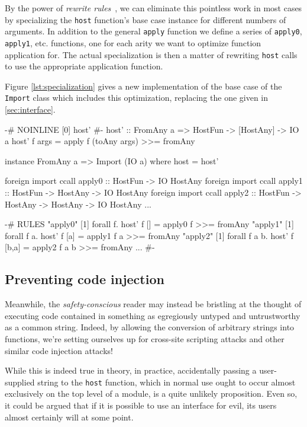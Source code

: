 \documentclass{sigplanconf}
\begin{document}
By the power of \emph{rewrite rules}\ \cite{rewriterules}, we can
eliminate this pointless work in most cases by specializing the
\lstinline!host! function's base case instance for different numbers of
arguments.
In addition to the general \lstinline!apply! function we define a series of
\lstinline!apply0!, \lstinline!apply1!, etc. functions, one for each arity
we want to optimize function application for.
The actual specialization is then a matter of
rewriting \lstinline!host! calls to use the appropriate application function.

Figure \ref{lst:specialization} gives a new implementation of the base case
of the \lstinline!Import! class which includes this optimization, replacing
the one given in \ref{sec:interface}.

\begin{listingfloat}
\begin{code}
  {-# NOINLINE [0] host' #-}
  host' :: FromAny a => HostFun -> [HostAny] -> IO a
  host' f args = apply f (toAny args) >>= fromAny

  instance FromAny a => Import (IO a) where
    host = host'
  
  foreign import ccall apply0 ::
    HostFun -> IO HostAny
  foreign import ccall apply1 ::
    HostFun -> HostAny -> IO HostAny
  foreign import ccall apply2 ::
    HostFun -> HostAny -> HostAny -> IO HostAny
  ...
  
  {-# RULES
    "apply0" [1] forall f. host' f [] =
                 apply0 f >>= fromAny
    "apply1" [1] forall f a. host' f [a] =
                 apply1 f a >>= fromAny
    "apply2" [1] forall f a b. host' f [b,a] =
                 apply2 f a b >>= fromAny
    ...
   #- }
\end{code}
\caption{Specializing the \lstinline!host! base case}
\label{lst:specialization}
\end{listingfloat}

\subsection{Preventing code injection}
\label{sec:safe_host}
Meanwhile, the \emph{safety-conscious} reader may instead be bristling at the
thought of executing code contained in something as egregiously untyped and
untrustworthy as a common string.
Indeed, by allowing the conversion of arbitrary strings
into functions, we're setting ourselves up for cross-site scripting attacks
and other similar code injection attacks!

While this is indeed true in theory, in practice, accidentally passing a
user-supplied string to the \lstinline!host! function, which in normal use
ought to occur almost exclusively on the top level of a module, is a quite
unlikely proposition. Even so, it could be argued that if it is possible to use
an interface for evil, its users almost certainly will at some point.
\end{document}

